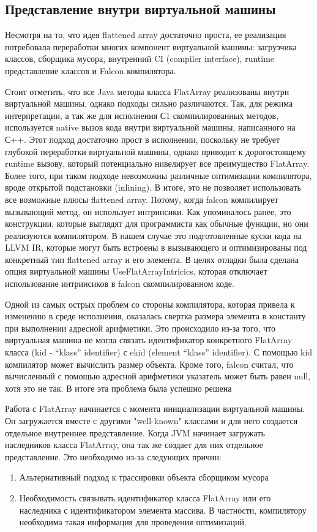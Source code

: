 \subsection{Представление внутри виртуальной машины}
Несмотря на то, что идея flattened array достаточно проста, ее реализация потребовала переработки многих компонент виртуальной машины: загрузчика классов, сборщика мусора, внутренний CI (compiler interface), runtime представление классов и Falcon компилятора.
\par 
Стоит отметить, что все Java методы класса FlatArray реализованы внутри виртуальной машины, однако подходы сильно различаются. Так, для режима интерпретации, а так же для исполнения С1 скомпилированных методов, используется native вызов кода внутри виртуальной машины, написанного на С++. Этот подход достаточно прост в исполнении, поскольку не требует глубокой переработки виртуальной машины, однако приводит к дорогостоящему runtime вызову, который потенциально нивелирует все преимущество FlatArray. Более того, при таком подходе невозможны различные оптимизации компилятора, вроде открытой подстановки (inlining).
В итоге, это не позволяет использовать все возможные плюсы flattened array. Потому, когда falcon компилирует вызывающий метод, он использует интринсики. Как упоминалось ранее, это конструкции, которые выглядят для программиста как обычные функции, но они реализуются компилятором. В нашем случае это подготовленные куски кода на LLVM IR, которые могут быть встроены в вызывающего и оптимизированы под конкретный тип flattened array и его элемента.
В целях отладки была сделана опция виртуальной машины UseFlatArrayIntricics, которая отключает использование интринсиков в falcon скомпилированном коде.   
\par
Одной из самых острых проблем со стороны компилятора, которая привела к изменению в среде исполнения, оказалась свертка размера элемента в константу при выполнении адресной арифметики. Это происходило из-за того, что виртуальная машина не могла связать идентификатор конкретного FlatArray класса (kid - “klass” identifier) с ekid (element “klass” identifier). С помощью kid компилятор может вычислить размер объекта. Кроме того, falcon считал, что вычисленный с помощью адресной арифметики указатель может быть равен null, хотя это не так. 
В итоге эта проблема была успешно решена
\par 
Работа с FlatArray начинается с момента инициализации виртуальной машины. Он загружается вместе с другими "well-known" классами и для него создается отдельное внутреннее представление. 
Когда JVM начинает загружать наследников класса FlatArray, она так же создает для них отдельное представление.
Это необходимо из-за следующих причин:
\begin{enumerate}
	\item Альтернативный подход к трассировки объекта сборщиком мусора
	\item Необходимость связывать идентификатор класса FlatArray или его наследника с идентификатором элемента массива. В частности, компилятору необходима такая информация для проведения оптимизаций.
\end{enumerate}

